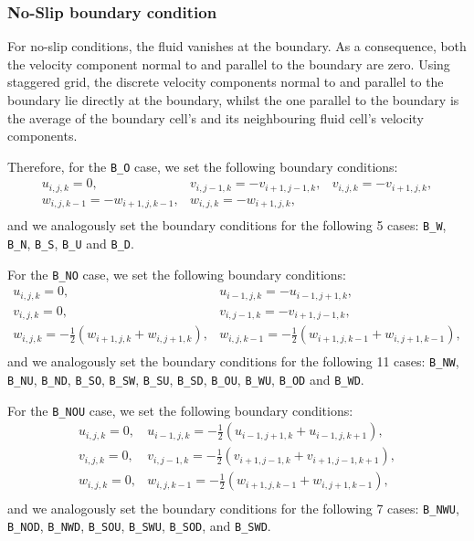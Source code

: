 \documentclass[a4paper, 12pt]{article}
\begin{document}
\subsubsection{No-Slip boundary condition}
For no-slip conditions, the fluid vanishes at the boundary. As a consequence, both the velocity component normal to and parallel to the boundary are zero. Using staggered grid, the discrete velocity components normal to and parallel to the boundary lie directly at the boundary, whilst the one parallel to the boundary is the average of the boundary cell's and its neighbouring fluid cell's velocity components.

Therefore, for the \texttt{B\_O} case, we set the following boundary conditions:
\begin{equation}
\begin{array}{lll}
u_{i,j,k} = 0, & v_{i,j-1,k} = -v_{i+1,j-1,k}, & v_{i,j,k} = -v_{i+1,j,k}, \\
w_{i,j,k-1} = -w_{i+1,j,k-1}, & w_{i,j,k} = -w_{i+1,j,k},& \\
\end{array}
\end{equation}
and we analogously set the boundary conditions for the following 5 cases: \texttt{B\_W}, \texttt{B\_N}, \texttt{B\_S}, \texttt{B\_U} and \texttt{B\_D}.

For the \texttt{B\_NO} case, we set the following boundary conditions:
\begin{equation}
\begin{array}{ll}
u_{i,j,k} = 0, & u_{i-1,j,k} = -u_{i-1,j+1,k}, \\
v_{i,j,k} = 0, & v_{i,j-1,k} = -v_{i+1,j-1,k}, \\
w_{i,j,k} = -\frac{1}{2}(w_{i+1,j,k}+w_{i,j+1,k}), &
w_{i,j,k-1} = -\frac{1}{2}(w_{i+1,j,k-1}+w_{i,j+1,k-1}), \\
\end{array}
\end{equation}
and we analogously set the boundary conditions for the following 11 cases: \texttt{B\_NW}, \texttt{B\_NU}, \texttt{B\_ND}, \texttt{B\_SO}, \texttt{B\_SW}, \texttt{B\_SU}, \texttt{B\_SD}, \texttt{B\_OU}, \texttt{B\_WU}, \texttt{B\_OD} and \texttt{B\_WD}.

For the \texttt{B\_NOU} case, we set the following boundary conditions:
\begin{equation}
\begin{array}{ll}
u_{i,j,k} = 0, & u_{i-1,j,k} = -\frac{1}{2}(u_{i-1,j+1,k}+u_{i-1,j,k+1}), \\
v_{i,j,k} = 0, & v_{i,j-1,k} = -\frac{1}{2}(v_{i+1,j-1,k}+v_{i+1,j-1,k+1}), \\
w_{i,j,k} = 0, & w_{i,j,k-1} = -\frac{1}{2}(w_{i+1,j,k-1}+w_{i,j+1,k-1}), \\
\end{array}
\end{equation}
and we analogously set the boundary conditions for the following 7 cases: \texttt{B\_NWU}, \texttt{B\_NOD}, \texttt{B\_NWD}, \texttt{B\_SOU}, \texttt{B\_SWU}, \texttt{B\_SOD}, and \texttt{B\_SWD}.
\end{document}
